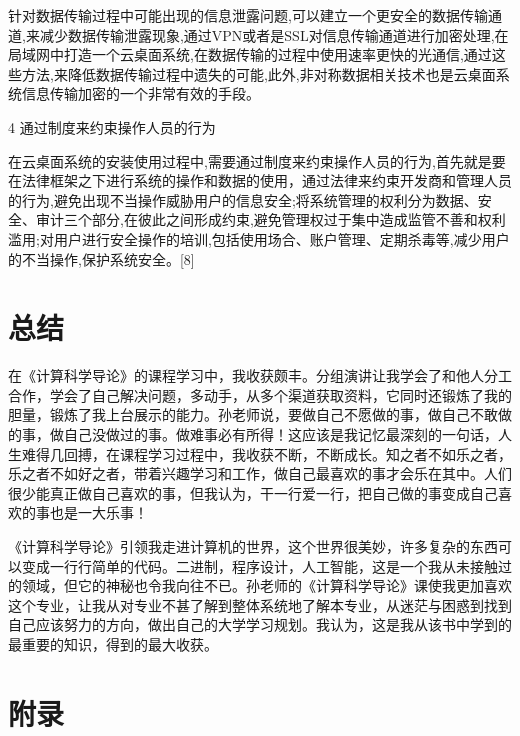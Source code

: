 \documentclass{article}
\begin{document}
\begin{itemize}
    针对数据传输过程中可能出现的信息泄露问题,可以建立一个更安全的数据传输通道,来减少数据传输泄露现象,通过VPN或者是SSL对信息传输通道进行加密处理,在局域网中打造一个云桌面系统,在数据传输的过程中使用速率更快的光通信,通过这些方法,来降低数据传输过程中遗失的可能,此外,非对称数据相关技术也是云桌面系统信息传输加密的一个非常有效的手段。\par
   4 通过制度来约束操作人员的行为\par 在云桌面系统的安装使用过程中,需要通过制度来约束操作人员的行为,首先就是要在法律框架之下进行系统的操作和数据的使用，通过法律来约束开发商和管理人员的行为,避免出现不当操作威胁用户的信息安全;将系统管理的权利分为数据、安全、审计三个部分,在彼此之间形成约束,避免管理权过于集中造成监管不善和权利滥用;对用户进行安全操作的培训,包括使用场合、账户管理、定期杀毒等,减少用户的不当操作,保护系统安全。[8]\par
   
\end{itemize}


\section{总结}
在《计算科学导论》的课程学习中，我收获颇丰。分组演讲让我学会了和他人分工合作，学会了自己解决问题，多动手，从多个渠道获取资料，它同时还锻炼了我的胆量，锻炼了我上台展示的能力。孙老师说，要做自己不愿做的事，做自己不敢做的事，做自己没做过的事。做难事必有所得！这应该是我记忆最深刻的一句话，人生难得几回搏，在课程学习过程中，我收获不断，不断成长。知之者不如乐之者，乐之者不如好之者，带着兴趣学习和工作，做自己最喜欢的事才会乐在其中。人们很少能真正做自己喜欢的事，但我认为，干一行爱一行，把自己做的事变成自己喜欢的事也是一大乐事！\par
《计算科学导论》引领我走进计算机的世界，这个世界很美妙，许多复杂的东西可以变成一行行简单的代码。二进制，程序设计，人工智能，这是一个我从未接触过的领域，但它的神秘也令我向往不已。孙老师的《计算科学导论》课使我更加喜欢这个专业，让我从对专业不甚了解到整体系统地了解本专业，从迷茫与困惑到找到自己应该努力的方向，做出自己的大学学习规划。我认为，这是我从该书中学到的最重要的知识，得到的最大收获。
\par

\newpage
\section{附录}
\end{document}
